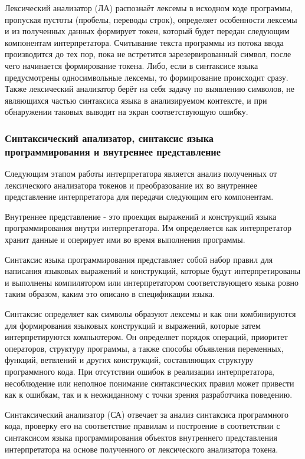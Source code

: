 Лексический анализатор (ЛА) распознаёт лексемы в исходном коде программы, пропуская пустоты (пробелы, переводы строк), определяет особенности лексемы и из полученных данных формирует токен, который будет передан следующим компонентам интерпретатора. Считывание текста программы из потока ввода производится до тех пор, пока не встретится зарезервированный символ, после чего начинается формирование токена. Либо, если в синтаксисе языка предусмотрены односимвольные лексемы, то формирование происходит сразу. Также лексический анализатор берёт на себя задачу по выявлению символов, не являющихся частью синтаксиса языка в анализируемом контексте, и при обнаружении таковых выводит на экран соответствующую ошибку.



\subsubsection{Синтаксический анализатор, синтаксис языка программирования и внутреннее представление}

Следующим этапом работы интерпретатора является анализ полученных от лексического анализатора токенов и преобразование их во внутреннее представление интерпретатора для передачи следующим его компонентам.

Внутреннее представление - это проекция выражений и конструкций языка программирования внутри интерпретатора. Им определяется как интерпретатор хранит данные и оперирует ими во время выполнения программы.

Синтаксис языка программирования представляет собой набор правил для написания языковых выражений и конструкций, которые будут интерпретированы и выполнены компилятором или интерпретатором соответствующего языка ровно таким образом, каким это описано в спецификации языка.

Синтаксис определяет как символы образуют лексемы и как они комбинируются для формирования языковых конструкций и выражений, которые затем интерпретируются компьютером. Он определяет порядок операций, приоритет операторов, структуру программы, а также способы объявления переменных, функций, ветвлений и других конструкций, составляющих структуру программного кода. При отсутствии ошибок в реализации интерпретатора, несоблюдение или неполное понимание синтаксических правил может привести как к ошибкам, так и к неожиданному с точки зрения разработчика поведению.

Синтаксический анализатор (СА) отвечает за анализ синтаксиса программного кода, проверку его на соответствие правилам и построение в соответствии с синтаксисом языка программирования объектов внутреннего представления интерпретатора на основе полученного от лексического анализатора токена.

